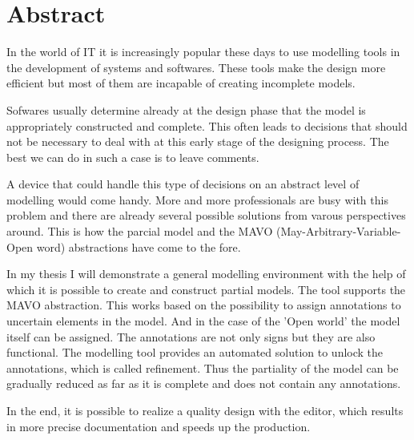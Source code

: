 \vfill
\selectenglish


\chapter*{Abstract}


In the world of IT it is increasingly popular these days to use modelling tools in the development of systems and softwares. These tools make the design more efficient but most of them are incapable of creating incomplete models. 
\par
Sofwares usually determine already at the design phase that the model is appropriately constructed and complete. This often leads to decisions that should not be necessary to deal with at this early stage of the designing process. The best we can do in such a case is to leave comments.
\par
A device that could handle this type of decisions on an abstract level of modelling would come handy. More and more professionals are busy with this problem and there are already several possible solutions from varous perspectives around. This is how the parcial model and the MAVO (May-Arbitrary-Variable-Open word) abstractions have come to the fore.
\par
In my thesis I will demonstrate a general modelling environment with the help of which it is possible to create and construct partial models. The tool supports the MAVO abstraction.  This works based on the possibility to assign annotations to uncertain elements in the model. And in the case of the 'Open world' the model itself can be assigned. The annotations are not only signs but they are also functional. The modelling tool provides an automated solution to unlock the annotations, which is called refinement. Thus the partiality of the model can be gradually reduced as far as it is complete and does not contain any annotations.
\par
In the end, it is possible to realize a quality design with the editor, which results in more precise documentation and speeds up the production.

\vfill
\selectthesislanguage

\setcounter{romanPage}{\value{page}}
